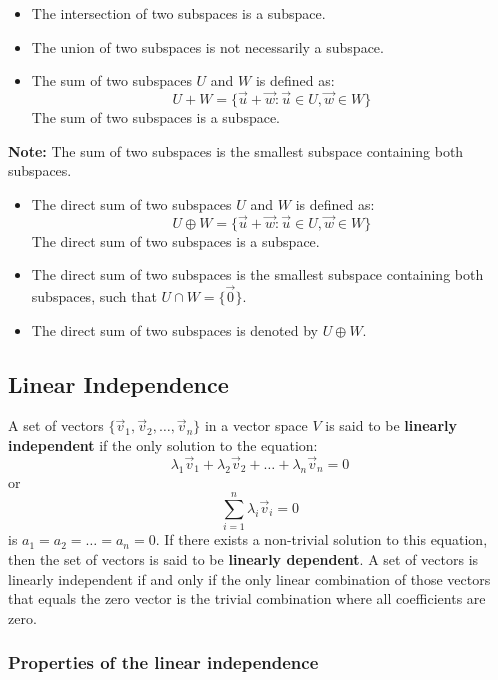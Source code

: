 \begin{itemize}[label=\(-\)]
	\item The intersection of two subspaces is a subspace.
	\item The union of two subspaces is not necessarily a subspace.
	\item The sum of two subspaces \(U\) and \(W\) is defined as:
	      \[
		      U + W = \{\vec{u} + \vec{w} : \vec{u} \in U, \vec{w} \in W\}
	      \]
	      The sum of two subspaces is a subspace.
\end{itemize}
\textbf{Note:} The sum of two subspaces is the smallest subspace containing both subspaces.
\begin{itemize}[label=\(-\)]
	\item The direct sum of two subspaces \(U\) and \(W\) is defined as:
	      \[
		      U \oplus W = \{\vec{u} + \vec{w} : \vec{u} \in U, \vec{w} \in W\}
	      \]
	      The direct sum of two subspaces is a subspace.
	\item The direct sum of two subspaces is the smallest subspace containing both subspaces, such that \(U \cap W = \{\vec{0}\}\).
	\item The direct sum of two subspaces is denoted by \(U \oplus W\).
\end{itemize}

\subsection{Linear Independence}

A set of vectors \(\{\vec{v}_1, \vec{v}_2, \ldots, \vec{v}_n\}\) in a vector space \(V\) is said to be \textbf{linearly independent} if the only solution to the equation:
\[
	\lambda_1\vec{v}_1 + \lambda_2\vec{v}_2 + \ldots + \lambda_n\vec{v}_n = 0
\]
or
\[
	\sum_{i=1}^n \lambda_i \vec{v}_i = 0
\]
is \(a_1 = a_2 = \ldots = a_n = 0\).
If there exists a non-trivial solution to this equation, then the set of vectors is said to be \textbf{linearly dependent}.
A set of vectors is linearly independent if and only if the only linear combination of those vectors that equals the zero vector is the trivial combination where all coefficients are zero.

\subsubsection{Properties of the linear independence}

